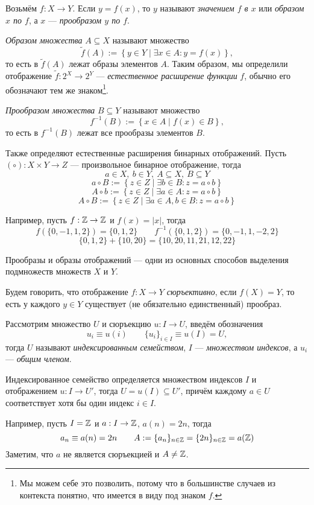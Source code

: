 Возьмём ${f:X\to Y}$. Если ${y=f(x)}$, то $y$ называют {\it значением $f$ в $x$}
или {\it образом $x$ по $f$},
а $x$ --- {\it прообразом $y$ по $f$}.

{\it Образом множества} $A\subseteq X$
называют множество
\[
	\widetilde f(A):=\left\{y\in Y\;\big|\; \exists x\in A:y=f(x)\right\},
\]
то есть в $\widetilde f(A)$ лежат образы элементов $A$. Таким образом, мы определили
отображение $\widetilde f:2^{X}\to 2^{Y}$ ---
{\it естественное расширение функции} $f$, обычно его обозначают
тем же знаком\footnote{Мы можем себе это позволить, потому что
	в большинстве случаев из контекста понятно, что имеется
	в виду под знаком $f$.}.

{\it Прообразом множества} $B\subseteq Y$ называют множество
\[
	f^{-1}(B):=\left\{x\in A\;\big|\; f(x)\in B\right\},
\]
то есть в $f^{-1}(B)$ лежат все прообразы элементов $B$.

Также определяют естественные расширения бинарных отображений.
Пусть $(\circ):X\times Y\to Z$ --- произвольное бинарное отображение, тогда
\[
	a\in X,~ b\in Y,~A\subseteq X,~ B\subseteq Y
\]
\[
	a\circ B:=\left\{z\in Z\;\big|\;\exists b\in B:z=a\circ b\right\}
\]
\[
	A\circ b:=\left\{z\in Z\;\big|\;\exists a\in A:z=a\circ b\right\}
\]
\[
	A\circ B:=\left\{z\in Z\;\big|\;\exists a\in A,b\in B:z=a\circ b\right\}
\]

Например, пусть $f:\mathbb Z\to\mathbb Z$ и $f(x)=|x|$, тогда
\[
	f(\{0,-1,1,2\})=\{0,1,2\}\qquad f^{-1}(\{0,1,2\})=\{0,-1,1,-2,2\}
\]
\[
	\{0,1,2\}+\{10,20\}=\{10,20,11,21,12,22\}
\]

Прообразы и образы отображений --- одни из основных способов выделения
подмножеств множеств $X$ и $Y$.

Будем говорить, что отображение $f:X\to Y$ {\it сюръективно}, если $f(X)=Y$,
то есть у каждого $y\in Y$ существует (не обязательно единственный) прообраз.

Рассмотрим множество $U$ и сюръекцию ${u:I\to U}$,
введём обозначения
\[
	u_{i}\equiv u(i)\qquad \{u_{i}\}_{i\in I}\equiv u(I)=U,
\]
тогда $U$ называют {\it индексированным семейством}, $I$ --- {\it множеством индексов},
а $u_{i}$ --- {\it общим членом}.

Индексированное семейство определяется множеством индексов $I$ и отображением
${u:I\to U'}$, тогда $U=u(I)\subseteq U'$,
причём каждому $a\in U$ соответствует хотя бы один индекс $i\in I$.

Например, пусть $I=\mathbb Z$ и $a:I\to \mathbb Z$, $a(n)=2n$, тогда
\[
	a_{n}\equiv a(n)=2n\qquad A:=\{a_{n}\}_{n\in\mathbb Z}=\{2n\}_{n\in\mathbb Z}=a(\mathbb Z)
\]
Заметим, что $a$ не является сюръекцией и $A\neq \mathbb Z$.

